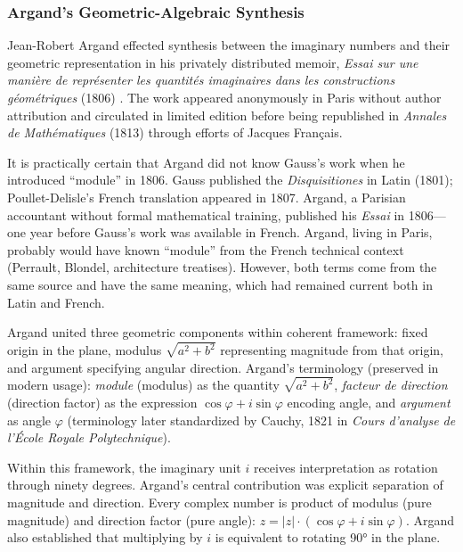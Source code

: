\subsubsection{Argand's Geometric-Algebraic Synthesis}

Jean-Robert Argand effected synthesis between the imaginary numbers and their geometric representation in his privately distributed memoir, \textit{Essai sur une manière de représenter les quantités imaginaires dans les constructions géométriques} (1806) \cite{Argand1806}. The work appeared anonymously in Paris without author attribution and circulated in limited edition before being republished in \textit{Annales de Mathématiques} (1813) through efforts of Jacques Français.

It is practically certain that Argand did not know Gauss's work when he introduced ``module'' in 1806. Gauss published the \textit{Disquisitiones} in Latin (1801); Poullet-Delisle's French translation appeared in 1807. Argand, a Parisian accountant without formal mathematical training, published his \textit{Essai} in 1806—one year before Gauss's work was available in French. Argand, living in Paris, probably would have known ``module'' from the French technical context (Perrault, Blondel, architecture treatises). However, both terms come from the same source and have the same meaning, which had remained current both in Latin and French.

Argand united three geometric components within coherent framework: fixed origin in the plane, modulus $\sqrt{a^2+b^2}$ representing magnitude from that origin, and argument specifying angular direction. Argand's terminology (preserved in modern usage): \textit{module} (modulus) as the quantity $\sqrt{a^2+b^2}$, \textit{facteur de direction} (direction factor) as the expression $\cos \varphi + i \sin \varphi$ encoding angle, and \textit{argument} as angle $\varphi$ (terminology later standardized by Cauchy, 1821 in \textit{Cours d'analyse de l'École Royale Polytechnique}).

Within this framework, the imaginary unit $i$ receives interpretation as rotation through ninety degrees. Argand's central contribution was explicit separation of magnitude and direction. Every complex number is product of modulus (pure magnitude) and direction factor (pure angle): $z = |z| \cdot (\cos \varphi + i \sin \varphi)$. Argand also established that multiplying by $i$ is equivalent to rotating 90° in the plane.

